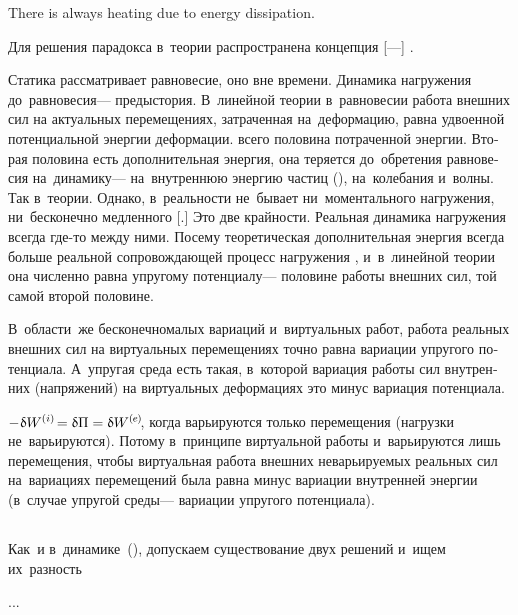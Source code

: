 \begin{otherlanguage}{russian}
There is always heating due to energy dissipation.

Для решения парадокса в~теории распространена концепция [---]   .

{\small
Статика рассматривает  равновесие, оно вне времени.
Динамика нагружения до~равновесия\:--- предыстория.
В~линейной теории в~равновесии работа внешних сил на актуальных перемещениях, затраченная на~деформацию, равна удвоенной потенциальной энергии деформации.
 всего половина потраченной энергии.
Вторая половина есть дополнительная энергия, она теряется до~обретения равновесия на~динамику\:--- на~внутреннюю энергию частиц (), на~колебания и~волны.
Так в~теории.
Однако, в~реальности не~бывает ни~моментального  нагружения, ни~бесконечно медленного [.]
Это две крайности.
Реальная динамика нагружения всегда где\hbox{-}то между ними.
Посему теоретическая дополнительная энергия всегда больше реальной сопровождающей процесс нагружения , и~в~линейной теории она численно равна упругому потенциалу\:--- половине работы внешних сил, той самой второй половине.

В~области~же бесконечномалых вариаций и~виртуальных работ, работа реальных внешних сил на виртуальных перемещениях точно равна вариации упругого потенциала.
А~упругая среда есть такая, в~которой вариация работы сил внутренних (напряжений) на виртуальных деформациях это минус вариация потенциала.

${- \hspace{.1ex} \variation{\internalwork} \hspace{-0.2ex} = \variation{\Pi} = \variation{\externalwork} \hspace{-0.25ex}}$, когда варьируются только перемещения (нагрузки не~варьируются).
Потому в~принципе виртуальной работы и~варьируются лишь перемещения, чтобы виртуальная работа внешних неварьируемых реальных сил на~вариациях перемещений была равна минус вариации внутренней энергии (в~случае упругой среды\:--- вариации упругого потенциала).
\par}

\subsection*{}

Как~и в~динамике~(), допускаем существование двух решений и~ищем их~разность

...

\end{otherlanguage}

